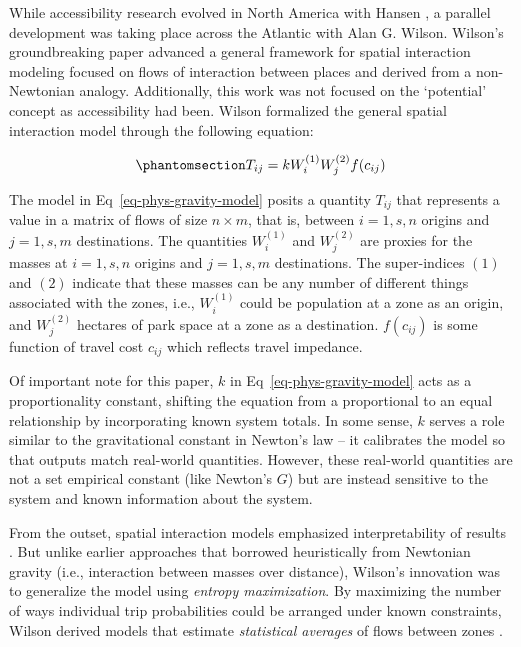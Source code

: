 \documentclass[
  10pt,
  letterpaper,
]{article}
\begin{document}
While accessibility research evolved in North America with Hansen
\citep{hansen1959}, a parallel development was taking place across the
Atlantic with Alan G. Wilson. Wilson's groundbreaking paper
\citep{wilson1971} advanced a general framework for spatial interaction
modeling focused on flows of interaction between places and derived from
a non-Newtonian analogy. Additionally, this work was not focused on the
`potential' concept as accessibility had been. Wilson \citep{wilson1971}
formalized the general spatial interaction model through the following
equation:

\begin{equation}\phantomsection\label{eq-phys-gravity-model}{
T_{ij} = k W_i^{(1)} W_j^{(2)} f(c_{ij})
}\end{equation}

The model in Eq~\ref{eq-phys-gravity-model} posits a quantity \(T_{ij}\)
that represents a value in a matrix of flows of size \(n \times m\),
that is, between \(i = 1,s, n\) origins and \(j = 1,s, m\) destinations.
The quantities \(W_i^{(1)}\) and \(W_j^{(2)}\) are proxies for the
masses at \(i=1,s,n\) origins and \(j=1,s,m\) destinations. The
super-indices \((1)\) and \((2)\) indicate that these masses can be any
number of different things associated with the zones, i.e.,
\(W_i^{(1)}\) could be population at a zone as an origin, and
\(W_j^{(2)}\) hectares of park space at a zone as a destination.
\(f(c_{ij})\) is some function of travel cost \(c_{ij}\) which reflects
travel impedance.

Of important note for this paper, \(k\) in
Eq~\ref{eq-phys-gravity-model} acts as a proportionality constant,
shifting the equation from a proportional to an equal relationship by
incorporating known system totals. In some sense, \(k\) serves a role
similar to the gravitational constant in Newton's law -- it calibrates
the model so that outputs match real-world quantities. However, these
real-world quantities are not a set empirical constant (like Newton's
\(G\)) but are instead sensitive to the system and known information
about the system.

From the outset, spatial interaction models emphasized interpretability
of results
\citep{kirbyNormalizingFactorsGravity1970, wilsonSTATISTICALTHEORYSPATIAL1967, wilson1971}.
But unlike earlier approaches that borrowed heuristically from Newtonian
gravity (i.e., interaction between masses over distance), Wilson's
innovation was to generalize the model using \emph{entropy
maximization}. By maximizing the number of ways individual trip
probabilities could be arranged under known constraints, Wilson derived
models that estimate \emph{statistical averages} of flows between zones
\citep{wilson1971, seniorGravityModellingEntropy1979}.
\end{document}
